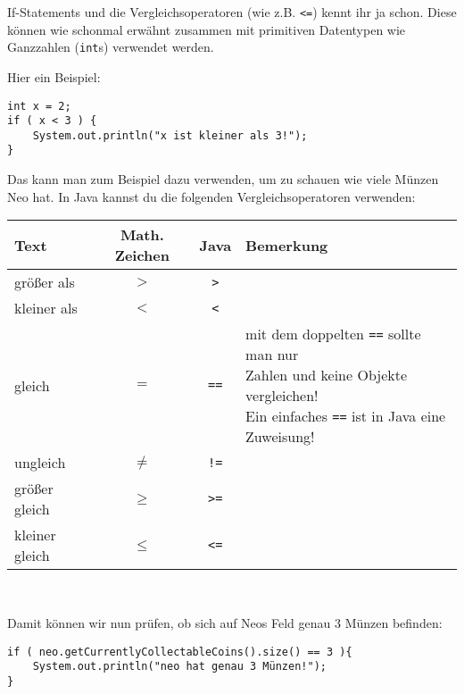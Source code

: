 \begin{Infobox}[If-Statements 2]

	If-Statements und die Vergleichsoperatoren (wie z.B. \lstinline{<=}) kennt ihr ja schon.
	Diese können wie schonmal erwähnt zusammen mit primitiven Datentypen wie Ganzzahlen (\lstinline{int}s) verwendet werden.

	Hier ein Beispiel:

	\begin{lstlisting}[numbers=none]
int x = 2;
if ( x < 3 ) {
	System.out.println("x ist kleiner als 3!");
}
	\end{lstlisting}

	Das kann man zum Beispiel dazu verwenden, um zu schauen wie viele Münzen Neo hat.
	In Java kannst du die folgenden Vergleichsoperatoren verwenden:

	\begin{center}
		\begin{tabular}{ l | c | c | l }
			Text & Math. Zeichen & Java & Bemerkung\\ \hline
			größer als & $>$ & \texttt{>} & \\
			kleiner als & $<$ & \texttt{<} & \\
			gleich & $=$ & \texttt{==} & \minibox{
					mit dem doppelten \texttt{==} sollte man nur \\
					Zahlen und keine Objekte vergleichen!\\
					Ein einfaches \texttt{==} ist in Java eine Zuweisung!
			}\\

			ungleich & $\neq$ & \texttt{!=} & \\
			größer gleich & $\geq$ & \texttt{>=} &  \\
			kleiner gleich & $\leq$ & \texttt{<=} &  \\
        \end{tabular} \\
	\end{center}

	Damit können wir nun prüfen, ob sich auf Neos Feld genau 3 Münzen befinden:

	\begin{lstlisting}[numbers=none]
if ( neo.getCurrentlyCollectableCoins().size() == 3 ){
	System.out.println("neo hat genau 3 Münzen!");
}
	\end{lstlisting}
\end{Infobox}


